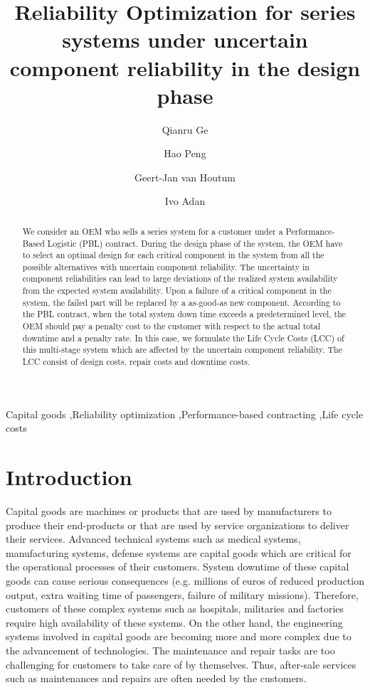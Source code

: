\documentclass[preprint,12pt]{elsarticle}
\begin{document}
\nocite{*}

\begin{frontmatter}
\title{Reliability Optimization for series systems under uncertain component reliability in the design phase}
\author[label1]{Qianru Ge}
\author[label1]{Hao Peng}
\author[label1]{Geert-Jan van Houtum}
\author[label1]{Ivo Adan}
\address[label1]{Department of Industrial Engineering and Innovation Sciences, Eindhoven University of Technology, Eindhoven, The Netherlands}

\begin{abstract}
We consider an OEM who sells a series system for a customer under a Performance-Based Logistic (PBL) contract. During the design phase of the system, the OEM have to select an optimal design for each critical component in the system from all the possible alternatives with uncertain component reliability. The uncertainty  in component reliabilities can lead to large deviations of the realized system availability from the expected system availability. Upon a failure of a critical component in the system, the failed part will be replaced by a as-good-as new component. According to the PBL contract, when the total system down time exceeds a predetermined level, the OEM should pay a penalty cost to the customer with respect to the actual total downtime and a penalty rate. In this case, we formulate the Life Cycle Costs (LCC) of this multi-stage system which are affected by the uncertain component reliability. The LCC consist of design costs, repair costs and downtime costs.
\end{abstract}

\begin{keyword}
Capital goods \sep Reliability optimization  \sep Performance-based contracting \sep Life cycle costs
\end{keyword}
\end{frontmatter}
\section{Introduction}
Capital goods are machines or products that are used by manufacturers to produce their end-products or that are used by service organizations to deliver their services. Advanced technical systems such as medical systems, manufacturing systems, defense systems are capital goods which are critical for the operational processes of their customers. System downtime of these capital goods can cause serious consequences (e.g. millions of euros of reduced production output, extra waiting time of passengers, failure of military missions). Therefore, customers of these complex systems such as hospitals, militaries and factories require high availability of these systems. On the other hand, the engineering systems involved in capital goods are becoming more and more complex due to the advancement of technologies. The maintenance and repair tasks are too challenging for customers to take care of by themselves. Thus, after-sale services such as maintenances and repairs are often needed by the customers.
\end{document}
